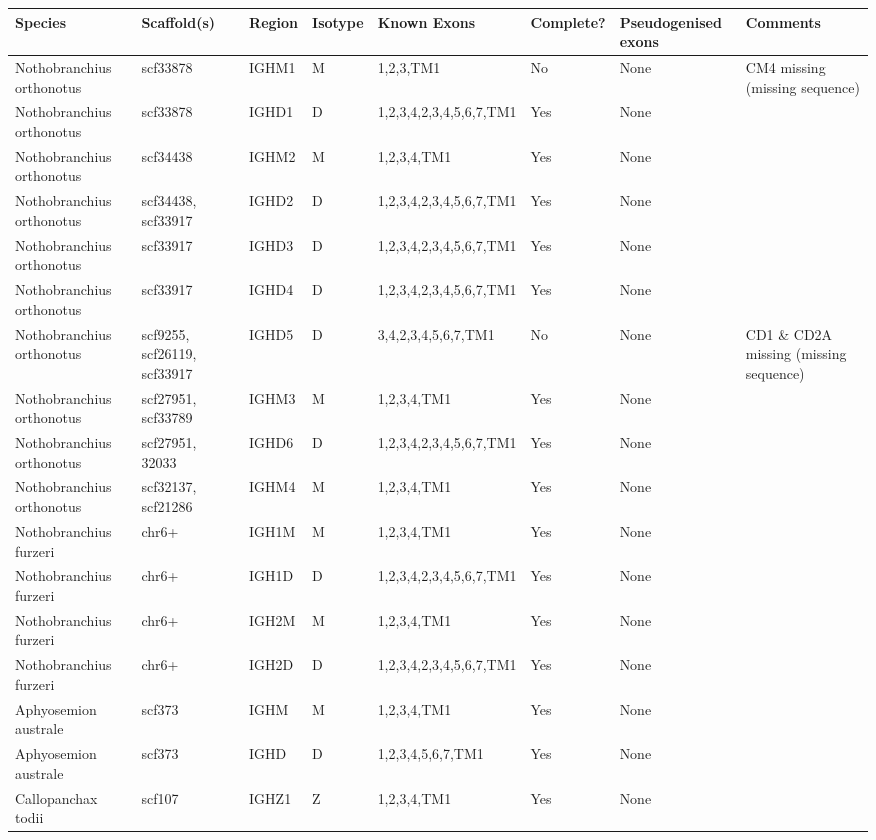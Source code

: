 \begin{tabular}{llllllll}
  \toprule Species & Scaffold(s) & Region & Isotype & Known Exons & Complete? & Pseudogenised exons & Comments \\ 
  \midrule Nothobranchius orthonotus & scf33878 & IGHM1 & M & 1,2,3,TM1 & No & None & CM4 missing (missing sequence) \\ 
  Nothobranchius orthonotus & scf33878 & IGHD1 & D & 1,2,3,4,2,3,4,5,6,7,TM1 & Yes & None &  \\ 
  Nothobranchius orthonotus & scf34438 & IGHM2 & M & 1,2,3,4,TM1 & Yes & None &  \\ 
  Nothobranchius orthonotus & scf34438, scf33917 & IGHD2 & D & 1,2,3,4,2,3,4,5,6,7,TM1 & Yes & None &  \\ 
  Nothobranchius orthonotus & scf33917 & IGHD3 & D & 1,2,3,4,2,3,4,5,6,7,TM1 & Yes & None &  \\ 
  Nothobranchius orthonotus & scf33917 & IGHD4 & D & 1,2,3,4,2,3,4,5,6,7,TM1 & Yes & None &  \\ 
  Nothobranchius orthonotus & scf9255, scf26119, scf33917 & IGHD5 & D & 3,4,2,3,4,5,6,7,TM1 & No & None & CD1 \& CD2A missing (missing sequence) \\ 
  Nothobranchius orthonotus & scf27951, scf33789 & IGHM3 & M & 1,2,3,4,TM1 & Yes & None &  \\ 
  Nothobranchius orthonotus & scf27951, 32033 & IGHD6 & D & 1,2,3,4,2,3,4,5,6,7,TM1 & Yes & None &  \\ 
  Nothobranchius orthonotus & scf32137, scf21286 & IGHM4 & M & 1,2,3,4,TM1 & Yes & None &  \\ 
  Nothobranchius furzeri & chr6+ & IGH1M & M & 1,2,3,4,TM1 & Yes & None &  \\ 
  Nothobranchius furzeri & chr6+ & IGH1D & D & 1,2,3,4,2,3,4,5,6,7,TM1 & Yes & None &  \\ 
  Nothobranchius furzeri & chr6+ & IGH2M & M & 1,2,3,4,TM1 & Yes & None &  \\ 
  Nothobranchius furzeri & chr6+ & IGH2D & D & 1,2,3,4,2,3,4,5,6,7,TM1 & Yes & None &  \\ 
  Aphyosemion australe & scf373 & IGHM & M & 1,2,3,4,TM1 & Yes & None &  \\ 
  Aphyosemion australe & scf373 & IGHD & D & 1,2,3,4,5,6,7,TM1 & Yes & None &  \\ 
  Callopanchax todii & scf107 & IGHZ1 & Z & 1,2,3,4,TM1 & Yes & None &  \\ 

\end{tabular}
